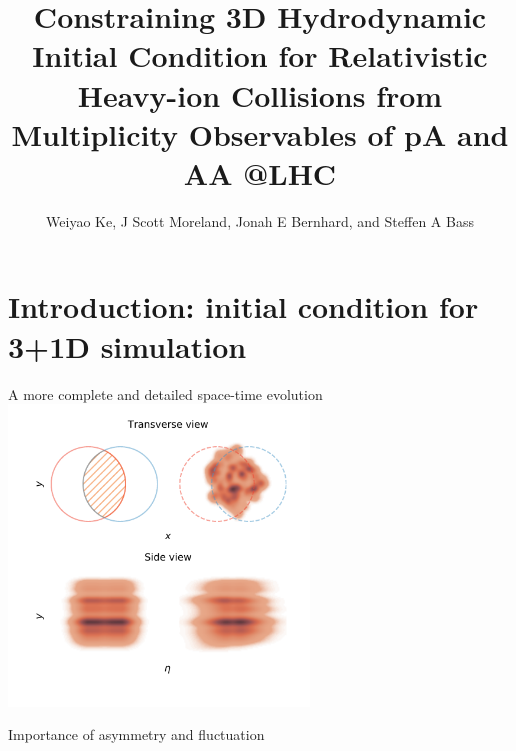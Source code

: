 \documentclass[11pt]{beamer}
\author[WK, JSM, JEB, and SAB]{Weiyao Ke, J Scott Moreland, Jonah E Bernhard,
		and Steffen A Bass}
\title[3D Initial Condition]{Constraining 3D Hydrodynamic Initial Condition for Relativistic
		Heavy-ion Collisions from Multiplicity Observables
		of pA and AA @LHC }
\begin{document}
\begin{frame}
\titlepage
\end{frame}

\begin{frame}
\tableofcontents
\end{frame}

\section{Introduction: initial condition for 3+1D simulation}
\begin{frame}{A more complete and detailed space-time evolution}
\includegraphics[width=0.6\textwidth]{nuclei_demo.pdf}
\end{frame}

\begin{frame}{Importance of asymmetry and fluctuation}

\end{frame}
\end{document}
